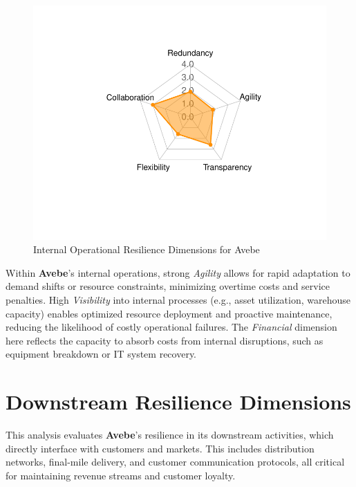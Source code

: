 \documentclass[
  oneside,
  open=any,
  fontsize=11pt]{scrbook}
\begin{document}
\begin{figure}[H]

{\centering \includegraphics[width=0.8\linewidth,height=\textheight,keepaspectratio]{example_3_files/figure-pdf/internal-radar-chart-1.pdf}

}

\caption{Internal Operational Resilience Dimensions for Avebe}

\end{figure}%

Within \textbf{Avebe}'s internal operations, strong \emph{Agility}
allows for rapid adaptation to demand shifts or resource constraints,
minimizing overtime costs and service penalties. High \emph{Visibility}
into internal processes (e.g., asset utilization, warehouse capacity)
enables optimized resource deployment and proactive maintenance,
reducing the likelihood of costly operational failures. The
\emph{Financial} dimension here reflects the capacity to absorb costs
from internal disruptions, such as equipment breakdown or IT system
recovery.

\section{Downstream Resilience
Dimensions}\label{downstream-resilience-dimensions}

This analysis evaluates \textbf{Avebe}'s resilience in its downstream
activities, which directly interface with customers and markets. This
includes distribution networks, final-mile delivery, and customer
communication protocols, all critical for maintaining revenue streams
and customer loyalty.
\end{document}
